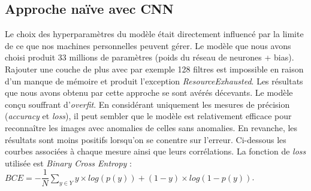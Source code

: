 \documentclass[french]{article}
\theoremstyle{mytheoremstyle}
\theoremstyle{mytheoremstyle}
\theoremstyle{myproblemstyle}
\begin{document}
    \subsection{Approche naïve avec CNN}
    Le choix des hyperparamètres du modèle était directement influencé par la limite de ce que nos machines personnelles peuvent gérer. Le modèle que nous avons choisi produit 33 millions de paramètres (poids du réseau de neurones + bias). Rajouter une couche de plus avec par exemple 128 filtres est impossible en raison d'un manque de mémoire et produit l'exception \textit{ResourceExhausted}.
    \newline
    \indent Les résultats que nous avons obtenu par cette approche se sont avérés décevants. Le modèle conçu souffrant d'\emph{overfit}. En considérant uniquement les mesures de précision (\emph{accuracy} et \emph{loss}), il peut sembler que le modèle est relativement efficace pour reconnaître les images avec anomalies de celles sans anomalies. En revanche, les résultats sont moins positifs lorsqu'on se conentre sur l'erreur. Ci-dessous les courbes associées à chaque mesure ainsi que leurs corrélations. La fonction de \emph{loss} utilisée est \textit{Binary Cross Entropy} : $BCE = -\dfrac{1}{N} \sum\limits_{y \in Y} y \times log(p(y)) + (1-y) \times log(1-p(y))$.
    
\end{document}
